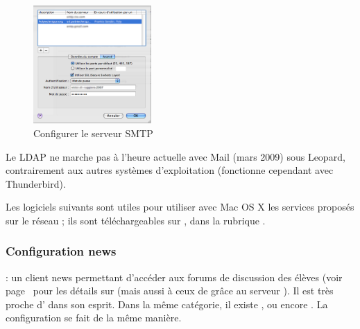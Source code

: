 \begin{figure}[!hl]
    \begin{center}

	      \includegraphics[width=0.4\textwidth]{images/mac_config_smtp_poltechnique.png} 
      \caption{Configurer le serveur SMTP }
    \end{center}
  \end{figure}



Le LDAP ne marche pas à l'heure actuelle avec Mail (mars 2009) sous Leopard, contrairement aux  autres systèmes d'exploitation (fonctionne cependant avec Thunderbird).



Les logiciels suivants sont utiles pour utiliser avec Mac OS X les services proposés sur le réseau ; ils sont téléchargeables sur , dans la rubrique .


\subsubsection{Configuration news}

  : un client news permettant d'accéder aux forums de discussion des élèves (voir page~\pageref{newsgroups} pour les détails sur  (mais aussi à ceux de  grâce au serveur ). Il est très proche d' dans son esprit. Dans la même catégorie, il existe ,  ou encore . La configuration se fait de la même manière.

